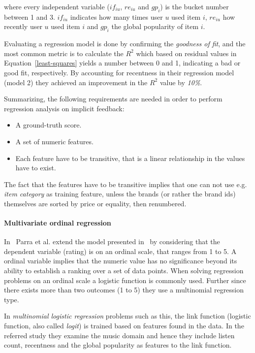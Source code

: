 where every independent variable ($if_{iu}$, $re_{iu}$ and $gp_{i}$) is the
bucket number between 1 and 3. $if_{iu}$ indicates how many times user $u$ used
item $i$, $re_{iu}$ how recently user $u$ used item $i$ and $gp_{i}$ the global
popularity of item $i$.

Evaluating a regression model is done by confirming the \textit{goodness of
fit}, and the most common metric is to calculate the $R^2$ which based on
residual values in Equation~\ref{least-squares} yields a number between 0 and
1, indicating a bad or good fit, respectively. By accounting for recentness in
their regression model (model 2) they achieved an improvement in the $R^2$
value by \textit{10\%}.

Summarizing, the following requirements are needed in order to perform
regression analysis on implicit feedback:

\begin{itemize}
  \item A ground-truth score.
  \item A set of numeric features.
  \item Each feature have to be transitive, that is a linear relationship in
  the values have to exist.
\end{itemize}

The fact that the features have to be transitive implies that one can not use
e.g. \textit{item category} as training feature, unless the brands (or rather
the brand ids) themselves are sorted by price or equality, then renumbered.

\paragraph{Multivariate ordinal regression}
In~\cite{parra2011implicit} Parra et al. extend the model presented
in~\cite{parra2011walk} by considering that the dependent variable (rating) is
on an ordinal scale, that ranges from 1 to 5. A ordinal variable implies that
the numeric value has no significance beyond its ability to establish a ranking
over a set of data points. When solving regression problems on an ordinal scale
a logistic function is commonly used. Further since there exists more than two
outcomes (1 to 5) they use a multinomial regression type.

In \textit{multinomial logistic regression} problems such as this, the link
function (logistic function, also called \textit{logit}) is trained based on
features found in the data. In the referred study they examine the music domain
and hence they include listen count, recentness and the global popularity as
features to the link function.

